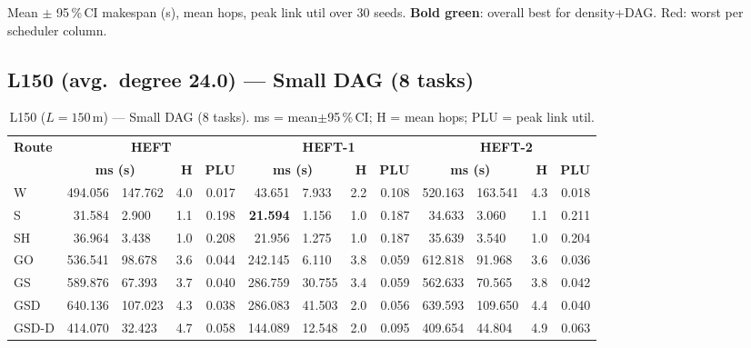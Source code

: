 \documentclass[11pt]{article}
\newcommand{\win}[1]{\textcolor{green!50!black}{\textbf{#1}}}
\newcommand{\bad}[1]{\textcolor{red!70!black}{#1}}
\begin{document}
Mean $\pm$ 95\,\%\,CI makespan (s), mean hops, peak link util over 30 seeds. \win{Bold green}: overall best for density+DAG. \bad{Red}: worst per scheduler column.

\subsection{L150 (avg.\ degree 24.0) --- Small DAG (8 tasks)}
\begin{table}[H]\centering\small
\begin{tabular}{l r@{$\pm$}l r r r@{$\pm$}l r r r@{$\pm$}l r r}
\toprule
\textbf{Route} & \multicolumn{4}{c}{\textbf{HEFT}} & \multicolumn{4}{c}{\textbf{HEFT-1}} & \multicolumn{4}{c}{\textbf{HEFT-2}} \\
\cmidrule(lr){2-5}\cmidrule(lr){6-9}\cmidrule(lr){10-13}
& \multicolumn{2}{c}{\textbf{ms (s)}} & \textbf{H} & \textbf{PLU}& \multicolumn{2}{c}{\textbf{ms (s)}} & \textbf{H} & \textbf{PLU}& \multicolumn{2}{c}{\textbf{ms (s)}} & \textbf{H} & \textbf{PLU} \\
\midrule
  W & 494.056 & 147.762 & 4.0 & 0.017 & 43.651 & 7.933 & 2.2 & 0.108 & 520.163 & 163.541 & 4.3 & 0.018 \\
  S & 31.584 & 2.900 & 1.1 & 0.198 & \win{21.594} & 1.156 & 1.0 & 0.187 & 34.633 & 3.060 & 1.1 & 0.211 \\
  SH & 36.964 & 3.438 & 1.0 & 0.208 & 21.956 & 1.275 & 1.0 & 0.187 & 35.639 & 3.540 & 1.0 & 0.204 \\
  GO & 536.541 & 98.678 & 3.6 & 0.044 & 242.145 & 6.110 & 3.8 & 0.059 & 612.818 & 91.968 & 3.6 & 0.036 \\
  GS & 589.876 & 67.393 & 3.7 & 0.040 & \bad{286.759} & 30.755 & 3.4 & 0.059 & 562.633 & 70.565 & 3.8 & 0.042 \\
  GSD & \bad{640.136} & 107.023 & 4.3 & 0.038 & 286.083 & 41.503 & 2.0 & 0.056 & \bad{639.593} & 109.650 & 4.4 & 0.040 \\
  GSD-D & 414.070 & 32.423 & 4.7 & 0.058 & 144.089 & 12.548 & 2.0 & 0.095 & 409.654 & 44.804 & 4.9 & 0.063 \\
\bottomrule\end{tabular}
\caption{L150 ($L=150$\,m) --- Small DAG (8 tasks). ms = mean$\pm$95\,\%\,CI; H = mean hops; PLU = peak link util.}
\end{table}
\end{document}
